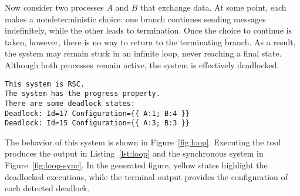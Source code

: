 \begin{example}\label{exm:loop}
Now consider two processes $A$ and $B$ that exchange data. At some
point, each makes a nondeterministic choice: one branch continues
sending messages indefinitely, while the other leads to termination.
Once the choice to continue is taken, however, there is no way to
return to the terminating branch. As a result, the system may remain
stuck in an infinite loop, never reaching a final state. Although both
processes remain active, the system is effectively deadlocked.

\begin{lstlisting}[language={},caption={Output of Example~\ref{exm:loop}.},
    label={lst:loop}]
This system is RSC.
The system has the progress property.
There are some deadlock states:
Deadlock: Id=17 Configuration={{ A:1; B:4 }}
Deadlock: Id=15 Configuration={{ A:3; B:3 }}
\end{lstlisting}

The behavior of this system is shown in Figure~\ref{fig:loop}. 
Executing the tool produces the output in
Listing~\ref{lst:loop} and the synchronous system in
Figure~\ref{fig:loop-sync}. In the
generated figure, yellow states highlight the deadlocked executions,
while the terminal output provides the configuration of each detected
deadlock.



\end{example}
